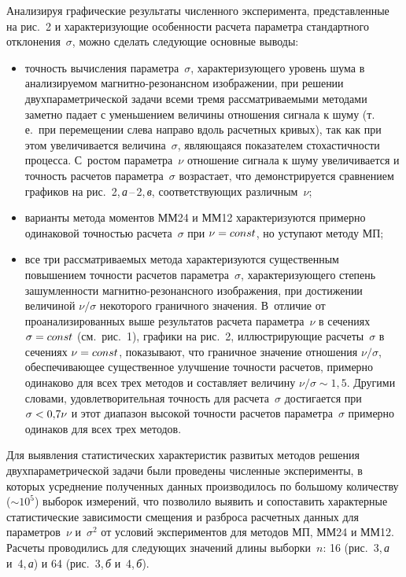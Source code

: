 \begin{multicols}{2}
    Анализируя графические результаты численного эксперимента, представленные на
рис.~2 и характеризующие особенности расчета параметра стандартного
отклонения~$\sigma$, можно сделать следующие основные выводы:
    \begin{itemize} %
\item точность вычисления параметра~$\sigma$, характеризующего уровень шума в
анализируемом маг\-нит\-но-ре\-зо\-нансном изображении, при решении
двухпараметрической задачи всеми тремя рассматриваемыми методами заметно падает с
уменьшением величины отношения сигнала к шуму (т.\,е.\ при перемещении слева
направо вдоль расчетных кривых), так как при этом увеличивается величина~$\sigma$,
являющаяся показателем стохастичности процесса. С~ростом параметра~$\nu$ отношение
сигнала к шуму увеличивается и точность расчетов параметра~$\sigma$ возрастает, что
демонстрируется сравнением графиков на рис.~2,\,\textit{а}\,--\,2,\,\textit{в},
соответствующих различным~$\nu$;
\item варианты метода моментов ММ24 и ММ12 характеризуются примерно одинаковой
точ\-ностью расчета~$\sigma$ при $\nu\hm=const$, но уступают методу МП;
\item все три рассматриваемых метода характеризуются существенным повышением
точности расчетов параметра~$\sigma$, характеризующего степень зашумленности
маг\-нит\-но-ре\-зо\-нансно\-го изображения, при достижении величиной $\nu/\sigma$
некоторого граничного значения. В~отличие от проанализированных выше результатов
расчета параметра~$\nu$ в сечениях $\sigma\hm =const$ (см.\ рис.~1), графики на рис.~2,
иллюстрирующие расчеты~$\sigma$ в сечениях $\nu \hm=const$, показывают, что
граничное значение отношения $\nu/\sigma$, обеспечивающее существенное улучшение
точности расчетов, примерно одинаково для всех трех методов и составляет величину
$\nu/\sigma \sim 1{,}5$. Другими словами, удовлетворительная точность для
расчета~$\sigma$ достигается при $\sigma \hm< 0{,}7\nu$ и этот диапазон высокой
точности расчетов параметра~$\sigma$ примерно одинаков для всех трех методов.
\end{itemize}

    Для выявления статистических характеристик развитых методов решения
двухпараметрической задачи были проведены численные эксперименты, в которых
усреднение полученных данных производилось по большому количеству ($\sim 10^5$)
выборок измерений, что позволило выявить и сопоставить характерные статистические
зависимости смещения и разброса расчетных данных для параметров~$\nu$ и~$\sigma^2$
от условий экспериментов для методов МП, ММ24 и ММ12. Расчеты проводились для
сле\-ду\-ющих значений длины выборки~$n$: 16 (рис.~3,\,\textit{а}
и~4,\,\textit{а}) и 64 (рис.~3,\,\textit{б} и~4,\,\textit{б}).





\end{multicols}
